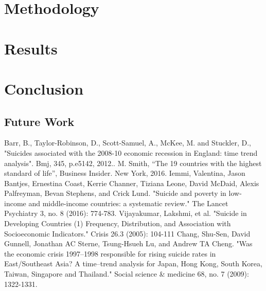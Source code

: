 \documentclass[conference]{IEEEtran}
\begin{document}
\section{Methodology}

\section{Results}

\section{Conclusion}

\subsection{Future Work}

\begin{thebibliography}{00}
 Barr, B., Taylor-Robinson, D., Scott-Samuel, A., McKee, M. and Stuckler, D., "Suicides associated with the 2008-10 economic recession in England: time trend analysis". Bmj, 345, p.e5142, 2012..
 M. Smith, ``The 19 countries with the highest standard of life'', Business Insider. New York, 2016.
 Iemmi, Valentina, Jason Bantjes, Ernestina Coast, Kerrie Channer, Tiziana Leone, David McDaid, Alexis Palfreyman, Bevan Stephens, and Crick Lund. "Suicide and poverty in low-income and middle-income countries: a systematic review." The Lancet Psychiatry 3, no. 8 (2016): 774-783.
 Vijayakumar, Lakshmi, et al. "Suicide in Developing Countries (1) Frequency, Distribution, and Association with Socioeconomic Indicators." Crisis 26.3 (2005): 104-111
 Chang, Shu-Sen, David Gunnell, Jonathan AC Sterne, Tsung-Hsueh Lu, and Andrew TA Cheng. "Was the economic crisis 1997–1998 responsible for rising suicide rates in East/Southeast Asia? A time–trend analysis for Japan, Hong Kong, South Korea, Taiwan, Singapore and Thailand." Social science \& medicine 68, no. 7 (2009): 1322-1331.
\end{thebibliography}
\vspace{12pt}
\end{document}
